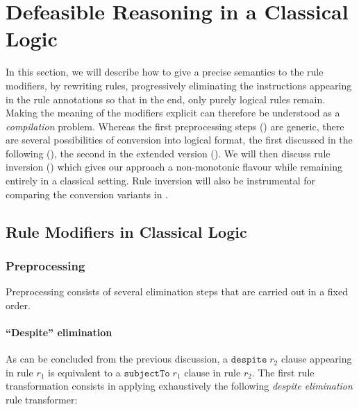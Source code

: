 \section{Defeasible Reasoning in a Classical Logic}\label{sec:defeasible_classical}

In this section, we will describe how to give a precise semantics to the rule
modifiers, by rewriting rules, progressively eliminating the instructions
appearing in the rule annotations so that in the end, only purely logical
rules remain. Making the meaning of the modifiers explicit can therefore be
understood as a \emph{compilation} problem.  Whereas the first preprocessing
steps () are generic, there are several
possibilities
of conversion into logical format, the first discussed in the following
(), the second in the extended version
(). We will then discuss rule inversion 
() which gives our approach a non-monotonic flavour
while remaining entirely in a classical setting. Rule inversion will also be
instrumental for comparing the conversion variants in .


\subsection{Rule Modifiers in Classical Logic}\label{sec:rule_modifiers_in_classical_logic}

\subsubsection{Preprocessing}\label{sec:preprocessing}

Preprocessing consists of several elimination steps that are carried out in a
fixed order.

\paragraph{\textbf{``Despite''  elimination}}

As can be concluded from the previous discussion, a
$\mathtt{despite}\; r_2$ clause appearing in rule $r_1$ is equivalent to a
$\mathtt{subjectTo}\; r_1$ clause in rule $r_2$. The first rule transformation
consists in applying exhaustively the following \emph{despite elimination}
rule transformer:

